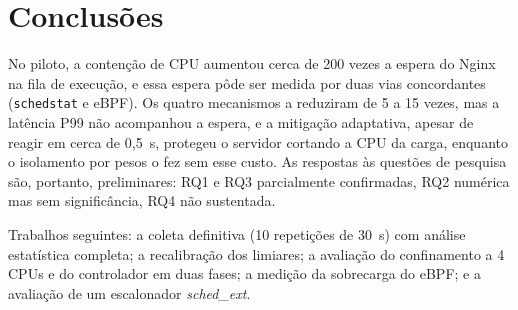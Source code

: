 \documentclass[12pt,a4paper]{article}
\begin{document}
\section{Conclusões}

No piloto, a contenção de CPU aumentou cerca de 200 vezes a espera do Nginx na fila de execução, e essa espera
pôde ser medida por duas vias concordantes (\texttt{schedstat} e eBPF). Os quatro mecanismos a reduziram de 5 a 15
vezes, mas a latência P99 não acompanhou a espera, e a mitigação adaptativa, apesar de reagir em cerca de
0,5~s, protegeu o servidor cortando a CPU da carga, enquanto o isolamento por pesos o fez sem esse custo. As
respostas às questões de pesquisa são, portanto, preliminares: RQ1 e RQ3 parcialmente confirmadas, RQ2 numérica
mas sem significância, RQ4 não sustentada.

Trabalhos seguintes: a coleta definitiva (10 repetições de 30~s) com análise estatística completa; a
recalibração dos limiares; a avaliação do confinamento a 4 CPUs e do controlador em duas fases; a medição da sobrecarga do eBPF; e a avaliação de um escalonador \textit{sched\_ext}.
\end{document}
